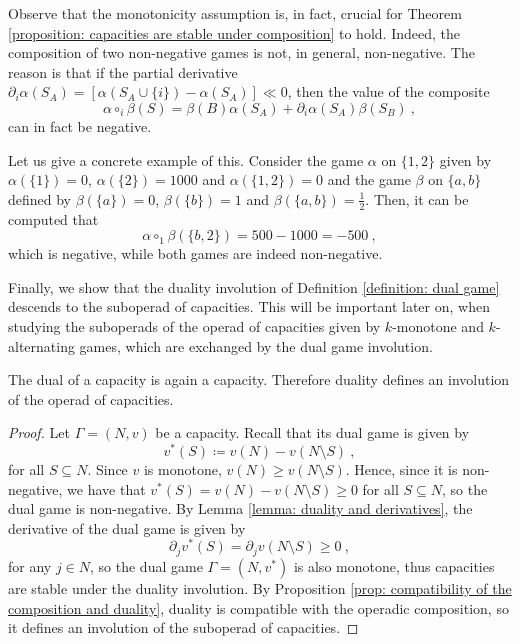 \documentclass[a4paper,12pt]{amsart}
\begin{document}
\begin{remark}
Observe that the monotonicity assumption is, in fact, crucial for Theorem \ref{proposition: capacities are stable under composition} to hold. Indeed, the composition of two non-negative games is not, in general, non-negative. The reason is that if the partial derivative $\partial_i \alpha(S_A) = [\alpha(S_A \cup \{i\}) - \alpha(S_A)] \ll 0$, then the value of the composite 
\[
\alpha \circ_i \beta(S) = \beta(B) \alpha(S_A) + \partial_i \alpha(S_A) \beta(S_B)~,
\]
can in fact be negative. 

\medskip

Let us give a concrete example of this. Consider the game $\alpha$ on $\{1, 2\}$ given by $\alpha(\{1\}) = 0$, $\alpha(\{2\}) = 1000$ and $\alpha(\{1, 2\}) = 0$ and the game $\beta$ on $\{a, b\}$ defined by $\beta(\{a\}) = 0$, $\beta(\{b\}) = 1$ and $\beta(\{a, b\}) = \frac{1}{2}$. Then, it can be computed that
\[
\alpha \circ_1 \beta(\{b, 2\}) = 500 - 1000 = -500~,
\]
which is negative, while both games are indeed non-negative. 
\end{remark}

Finally, we show that the duality involution of Definition \ref{definition: dual game} descends to the suboperad of capacities. This will be important later on, when studying the suboperads of the operad of capacities given by $k$-monotone and $k$-alternating games, which are exchanged by the dual game involution. 

\begin{proposition}\label{prop: the dual of a capacity is a capacity}
The dual of a capacity is again a capacity. Therefore duality defines an involution of the operad of capacities.
\end{proposition}

\begin{proof}
Let $\Gamma = (N,v)$ be a capacity. Recall that its dual game is given by 
\[
v^*(S) \coloneqq v(N) - v(N \setminus S)~,
\]
for all $S \subseteq N$. Since $v$ is monotone, $v(N) \geq v(N \setminus S)$. Hence, since it is non-negative, we have that $v^*(S) = v(N) - v(N \setminus S) \geq 0$ for all $S \subseteq N$, so the dual game is non-negative. By Lemma \ref{lemma: duality and derivatives}, the derivative of the dual game is given by 
\[
\partial_jv^*(S) = \partial_jv(N \setminus S) \geq 0~, 
\]
for any $j \in N$, so the dual game $\Gamma = (N,v^*)$ is also monotone, thus capacities are stable under the duality involution. By Proposition \ref{prop: compatibility of the composition and duality}, duality is compatible with the operadic composition, so it defines an involution of the suboperad of capacities. 
\end{proof}
\end{document}
